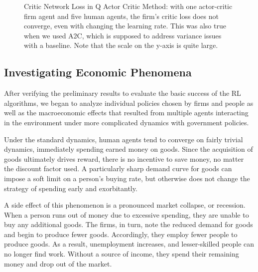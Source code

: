 \documentclass[twoside,twocolumn]{article}
\begin{document}
\begin{figure}[h]
\caption{Critic Network Loss in Q Actor Critic Method: with one actor-critic firm agent and five human agents, the firm's critic loss does not converge, even with changing the learning rate. This was also true when we used A2C, which is supposed to address variance issues with a baseline. Note that the scale on the y-axis is quite large.}
\label{plt:acadvloss}
\end{figure}




\subsection{Investigating Economic Phenomena}

After verifying the preliminary results to evaluate the basic success of the RL algorithms, we began to analyze individual policies chosen by firms and people as well as the macroeconomic effects that resulted from multiple agents interacting in the environment under more complicated dynamics with government policies. 

Under the standard dynamics, human agents tend to converge on fairly trivial dynamics, immediately spending earned money on goods. Since the acquisition of goods ultimately drives reward, there is no incentive to save money, no matter the discount factor used. A particularly sharp demand curve for goods can impose a soft limit on a person’s buying rate, but otherwise does not change the strategy of spending early and exorbitantly.

A side effect of this phenomenon is a pronounced market collapse, or recession. When a person runs out of money due to excessive spending, they are unable to buy any additional goods. The firms, in turn, note the reduced demand for goods and begin to produce fewer goods. Accordingly, they employ fewer people to produce goods. As a result, unemployment increases, and lesser-skilled people can no longer find work. Without a source of income, they spend their remaining money and drop out of the market.
\end{document}
